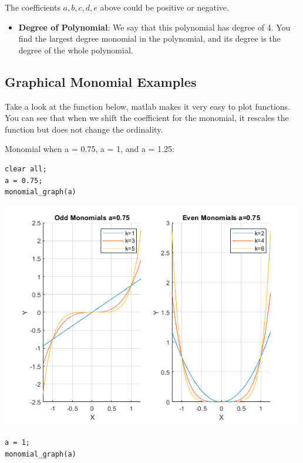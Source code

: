 \documentclass[
]{book}
\providecommand{\tightlist}{%
  \setlength{\itemsep}{0pt}\setlength{\parskip}{0pt}}
\begin{document}
The coefficients \(a,b,c,d,e\) above could be positive or negative.

\begin{itemize}
\tightlist
\item
  \textbf{Degree of Polynomial}: We say that this polynomial has degree
  of 4. You find the largest degree monomial in the polynomial, and
  its degree is the degree of the whole polynomial.
\end{itemize}

\hypertarget{graphical-monomial-examples}{%
\subsection{Graphical Monomial Examples}\label{graphical-monomial-examples}}

Take a look at the function below, matlab makes it very easy to plot
functions. You can see that when we shift the coefficient for the
monomial, it rescales the function but does not change the ordinality.

Monomial when a = 0.75, a = 1, and a = 1.25:

\begin{verbatim}
clear all;
a = 0.75;
monomial_graph(a)
\end{verbatim}

\includegraphics[width=5.20833in,height=\textheight]{img/polynomial_images/figure_0.png}

\begin{verbatim}
a = 1;
monomial_graph(a)
\end{verbatim}
\end{document}

